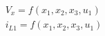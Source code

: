 \begin{align*}
  \tag{Salida $y_1$}
  V_x = f(x_1, x_2, x_3, u_1) \\
  \tag{Salida $y_2$}
  i_{L1} = f(x_1, x_2, x_3, u_1)
\end{align*}

